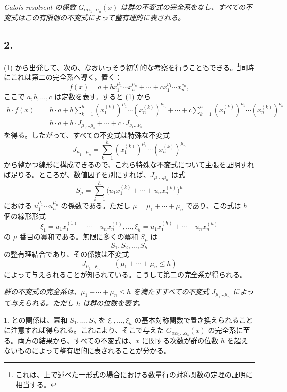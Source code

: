 \documentclass[11pt]{article}
\begin{document}
\emph{Galois resolvent の係数 $G_{\alpha\alpha_1\ldots\alpha_n}(x)$ は群の不変式の完全系をなし、すべての不変式はこの有限個の不変式によって整有理的に表される。}

\subsection*{2.}
(1) から出発して、次の、なおいっそう初等的な考察を行うこともできる。\footnote{これは、上で述べた一形式の場合における数量行の対称関数の定理の証明に相当する。}同時にこれは第二の完全系へ導く。置く：
\[
  f(x)=a+b x_1^{\mu_1}\cdots x_n^{\mu_n}
       +\cdots+c x_1^{\nu_1}\cdots x_n^{\nu_n},
\]
ここで $a,b,\ldots,c$ は定数を表す。すると (1) から
\[
\begin{aligned}
 h\cdot f(x)
 &=h\cdot a+b\sum_{k=1}^{h}(x_1^{(k)})^{\mu_1}\cdots(x_n^{(k)})^{\mu_n}
     +\cdots
     +c\sum_{k=1}^{h}(x_1^{(k)})^{\nu_1}\cdots(x_n^{(k)})^{\nu_n} \\
 &=h\cdot a+b\cdot J_{\mu_1\ldots\mu_n}+\cdots+c\cdot J_{\nu_1\ldots\nu_n}
\end{aligned}
\]
を得る。したがって、すべての不変式は特殊な不変式
\[
  J_{\mu_1\ldots\mu_n}
  =\sum_{k=1}^{h}(x_1^{(k)})^{\mu_1}\cdots(x_n^{(k)})^{\mu_n}
\]
から整かつ線形に構成できるので、これら特殊な不変式について主張を証明すれば足りる。ところが、数値因子を別にすれば、$J_{\mu_1\ldots\mu_n}$ は式
\[
  S_\mu=\sum_{k=1}^{h}
  \bigl(u_1x_1^{(k)}+\cdots+u_nx_n^{(k)}\bigr)^{\mu}
\]
における $u_1^{\mu_1}
\cdots u_n^{\mu_n}$ の係数である。ただし $\mu=\mu_1+\cdots+\mu_n$ であり、この式は $h$ 個の線形形式
\[
  \xi_1=u_1x_1^{(1)}+\cdots+u_nx_n^{(1)},\ldots,
  \xi_h=u_1x_1^{(h)}+\cdots+u_nx_n^{(h)}
\]
の $\mu$ 番目の冪和である。無限に多くの冪和 $S_\mu$ は
\[
  S_1,S_2,\ldots,S_h
\]
の整有理結合であり、その係数は不変式
\[
  J_{\mu_1\ldots\mu_n}\qquad(\mu_1+\cdots+\mu_n\le h)
\]
によって与えられることが知られている。こうして第二の完全系が得られる。

\emph{群の不変式の完全系は、$\mu_1+\cdots+\mu_n\le h$ を満たすすべての不変式 $J_{\mu_1\ldots\mu_n}$ によって与えられる。ただし $h$ は群の位数を表す。}

1. との関係は、冪和 $S_1,
\ldots,S_h$ を $\xi_1,
\ldots,
\xi_h$ の基本対称関数で置き換えられることに注意すれば得られる。これにより、そこで与えた $G_{\alpha\alpha_1\ldots\alpha_n}(x)$ の完全系に至る。両方の結果から、すべての不変式は、$x$ に関する次数が群の位数 $h$ を超えないものによって整有理的に表されることが分かる。
\end{document}
